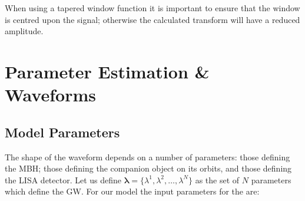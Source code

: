 When using a tapered window function it is important to ensure that the window is centred upon the signal; otherwise the calculated transform will have a reduced amplitude.

\section{Parameter Estimation \& Waveforms}

\subsection{Model Parameters}\label{sec:Parameters}

The shape of the waveform depends on a number of parameters: those defining the MBH; those defining the companion object on its orbits, and those defining the LISA detector. Let us define $\boldsymbol{\lambda} = \{\lambda^1, \lambda^2, \ldots, \lambda^N\}$ as the set of $N$ parameters which define the GW. For our model the input parameters for the are:
